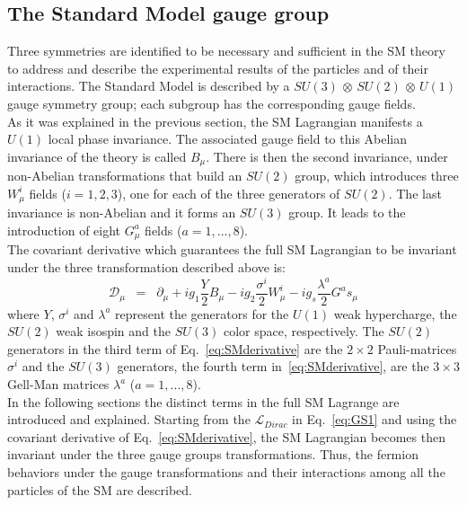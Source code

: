 \subsection{The Standard Model gauge group}\label{sec:gauge group}
Three symmetries are identified to be necessary and sufficient in the SM theory to address and describe the experimental results of the particles and of their interactions. The Standard Model is described by a $SU(3)$ $\otimes$ $SU(2)$ $\otimes$ $U(1)$ gauge symmetry group; each subgroup has the corresponding gauge fields.\\
As it was explained in the previous section, the SM Lagrangian manifests a $U(1)$ local phase invariance. The associated gauge field to this Abelian invariance of the theory is called $B_\mu$. There is then the second invariance, under non-Abelian transformations that build an $SU(2)$ group, which introduces three $W^i_\mu$ fields ($i = 1,2,3$), one for each of the three generators of $SU(2)$. The last invariance is  non-Abelian and it forms an $SU(3)$ group. It leads to the introduction of eight $G^a_\mu$ fields ($a = 1,...,8$).\\
The covariant derivative which guarantees the full SM Lagrangian to be invariant under the three transformation described above is:
\begin{equation}
\label{eq:SMderivative}
\mathcal{D}_{\mu} \;\; = \;\; \partial_{\mu} + ig_1\frac{Y}{2}B_{\mu} - ig_2\frac{\sigma^i}{2}W^i_{\mu} - ig_s\frac{\lambda^a}{2}G^as_{\mu}
\end{equation}
where $Y$, $\sigma^i$ and $\lambda^a$ represent the generators for the $U(1)$ weak hypercharge, the $SU(2)$ weak isospin and the $SU(3)$ color space, respectively. The $SU(2)$ generators in the third term of Eq.~\ref{eq:SMderivative} are the $2\times2$ Pauli-matrices $\sigma^i$ and the $SU(3)$ generators, the fourth term in~\ref{eq:SMderivative}, are the $3\times3$ Gell-Man matrices $\lambda^a$ ($a = 1,...,8$).\\

In the following sections the distinct terms in the full SM Lagrange are introduced and explained. Starting from the $\mathcal{L}_{Dirac}$ in Eq.~\ref{eq:GS1} and using the covariant derivative of Eq.~\ref{eq:SMderivative}, the SM Lagrangian becomes then invariant under the three gauge groups transformations. Thus, the fermion behaviors under the gauge transformations and their interactions among all the particles of the SM  are described. 

